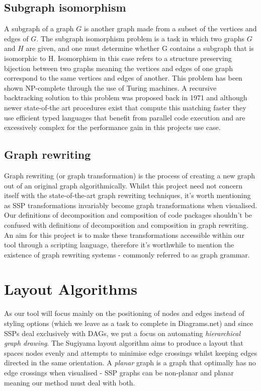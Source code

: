 \documentclass[bsc,frontabs,singlespacing,parskip,deptreport]{infthesis}
\begin{document}
\subsection{Subgraph isomorphism}
A subgraph of a graph $G$ is another graph made from a subset of the vertices and edges of $G$. The subgraph isomorphism problem is a task in which two graphs $G$ and $H$ are given, and one must determine whether G contains a subgraph that is isomorphic to H. Isomorphism in this case refers to a structure preserving bijection between two graphs meaning the vertices and edges of one graph correspond to the same vertices and edges of another. This problem has been shown NP-complete through the use of Turing machines\cite{cook1971complexity}. A recursive backtracking solution to this problem was proposed back in 1971\cite{ullmann1976algorithm} and although newer state-of-the art procedures exist that compute this matching faster\cite{mccreesh2020glasgow} they use efficient typed languages that benefit from parallel code execution and are excessively complex for the performance gain in this projects use case.

\subsection{Graph rewriting}
Graph rewriting (or graph transformation) is the process of creating a new graph out of an original graph algorithmically. Whilst this project need not concern itself with the state-of-the-art graph rewriting techniques, it's worth mentioning as SSP transformations invariably become graph transformations when visualised. Our definitions of decomposition and composition of code packages shouldn't be confused with definitions of decomposition and composition in graph rewriting. An aim for this project is to make these transformations accessible within our tool through a scripting language, therefore it's worthwhile to mention the existence of graph rewriting systems - commonly referred to as graph grammar.  

\section{Layout Algorithms}
As our tool will focus mainly on the positioning of nodes and edges instead of styling options (which we leave as a task to complete in Diagrams.net) and since SSPs deal exclusively with DAGs, we put a focus on automating \textit{hierarchical graph drawing}. The Sugiyama layout algorithm\cite{sugiyama1981methods} aims to produce a layout that spaces nodes evenly and attempts to minimise edge crossings whilst keeping edges directed in the same orientation. A \textit{planar} graph is a graph that optimally has no edge crossings when visualised - SSP graphs can be non-planar and planar meaning our method must deal with both. 
\end{document}

